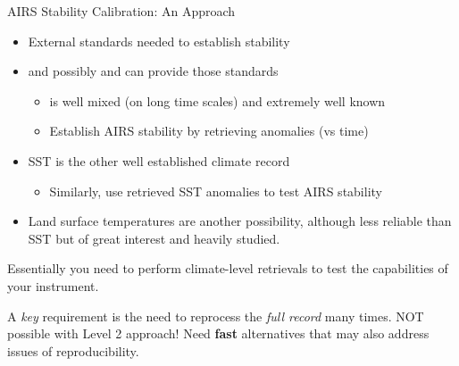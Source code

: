 \documentclass[10pt,t]{beamer}
\begin{document}
\begin{frame}[label={sec:org3519070}]{AIRS Stability Calibration: An Approach}
\begin{itemize}
\item External standards needed to establish stability
\item \cd and possibly \nitrous and \methane can provide those standards
\begin{itemize}
\item \cd is well mixed (on long time scales) and extremely well known
\item Establish AIRS stability by retrieving \cd anomalies (vs time)
\end{itemize}
\item SST is the other well established climate record
\begin{itemize}
\item Similarly, use retrieved SST anomalies to test AIRS stability
\end{itemize}
\item Land surface temperatures are another possibility, although less reliable than SST but of great interest and heavily studied.
\end{itemize}

Essentially you need to perform climate-level retrievals to test the capabilities of your instrument.  

A \emph{key} requirement is the need to reprocess the \emph{full record} many times.  NOT possible with Level 2 approach!  Need \textbf{fast} alternatives that may also address issues of reproducibility.
\end{frame}
\end{document}

